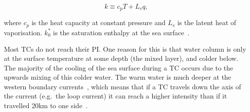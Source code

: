\begin{equation}
k \equiv c_{p} T+L_{v} q,
\label{eq:enthalpy_per_unit_mass}
\end{equation}



where $c_p$ is the heat capacity at constant pressure and $L_{v}$ is the latent heat
of vaporisation. $k_{0}^{*}$ is the saturation enthalpy at the sea
surface~\cite{emanuel2018progress}.%






Most TCs do not reach their PI.
One reason for this is that
water column is only at the surface temperature
at some depth (the mixed layer), and colder below.
The majority of the cooling of
the sea surface during a TC occurs due to the
upwards mixing of this colder water.
The warm water
is much deeper at the western boundary currents~\cite{hogg1995western},
which means that if a TC
travels down the axis of the current (e.g.~the loop current)
it can reach a higher intensity than
if it travelled 20km to one side~\cite{emanuel2005divine}.
